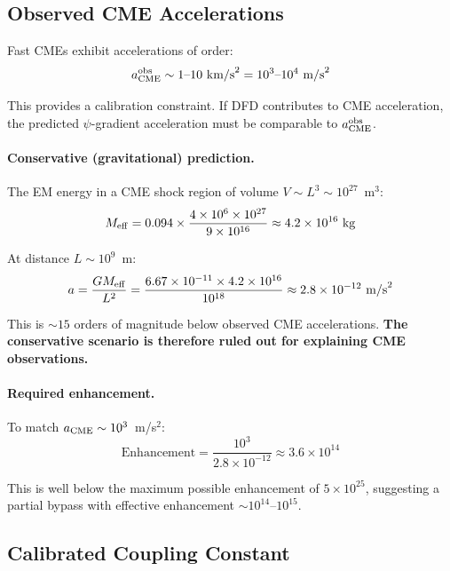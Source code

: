 \documentclass[12pt,a4paper]{article}
\begin{document}
\subsection{Observed CME Accelerations}

Fast CMEs exhibit accelerations of order:
\begin{equation}
a_{\rm CME}^{\rm obs} \sim 1\text{--}10~\text{km/s}^2 = 10^3\text{--}10^4~\text{m/s}^2
\end{equation}

This provides a calibration constraint.  If DFD contributes to CME acceleration,
the predicted $\psi$-gradient acceleration must be comparable to $a_{\rm CME}^{\rm obs}$.

\paragraph{Conservative (gravitational) prediction.}
The EM energy in a CME shock region of volume $V \sim L^3 \sim 10^{27}$~m$^3$:
\begin{equation}
M_{\rm eff} = 0.094 \times \frac{4 \times 10^6 \times 10^{27}}{9 \times 10^{16}}
\approx 4.2 \times 10^{16}~\text{kg}
\end{equation}

At distance $L \sim 10^9$~m:
\begin{equation}
a = \frac{G M_{\rm eff}}{L^2} = \frac{6.67 \times 10^{-11} \times 4.2 \times 10^{16}}{10^{18}}
\approx 2.8 \times 10^{-12}~\text{m/s}^2
\end{equation}

This is $\sim 15$ orders of magnitude below observed CME accelerations.
\textbf{The conservative scenario is therefore ruled out for explaining
CME observations.}

\paragraph{Required enhancement.}
To match $a_{\rm CME} \sim 10^3$~m/s$^2$:
\begin{equation}
\text{Enhancement} = \frac{10^3}{2.8 \times 10^{-12}} \approx 3.6 \times 10^{14}
\end{equation}

This is well below the maximum possible enhancement of $5 \times 10^{25}$,
suggesting a partial bypass with effective enhancement $\sim 10^{14}$--$10^{15}$.

\subsection{Calibrated Coupling Constant}
\end{document}
